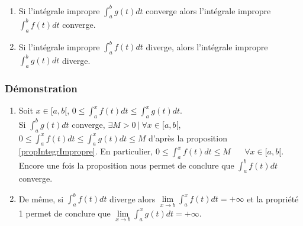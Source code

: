 \documentclass[a4paper,10pt]{book} %
\newcommand{\tq}{~|~}
\newcommand{\displayAmath}{\displaystyle}
\begin{document}
\begin{enumerate}
\item Si l'intégrale impropre $\displayAmath \int_a^bg(t)dt$ converge alors l'intégrale impropre $\displayAmath \int_a^bf(t)dt$ converge.

\item Si l'intégrale impropre $\displayAmath \int_a^bf(t)dt$ diverge, alors l'intégrale impropre $\displayAmath \int_a^bg(t)dt$ diverge.

\end{enumerate}

\subsubsection{Démonstration}
\begin{enumerate}
\item Soit $x\in [a,b[$, $\displayAmath 0\leq \int_a^xf(t)dt\leq \int_a^xg(t)dt$.\\
Si $\displayAmath \int_a^bg(t)dt$ converge, $\exists M>0\tq\forall x\in [a,b[$, $\displayAmath 0\leq \int_a^xf(t)dt\leq \int_a^xg(t)dt\leq M$ d'après la proposition \ref{propIntegrImpropre}. En particulier, $\displayAmath 0\leq \int_a^xf(t)dt\leq M$ ~~ $\forall x\in [a,b[$.\\
Encore une fois la proposition nous permet de conclure que $\displayAmath \int_a^bf(t)dt$ converge.

\item De même, si $\displayAmath \int_a^b f(t)dt$ diverge alors $\displayAmath \lim\limits_{x\rightarrow b}\int_a^xf(t)dt=+\infty$ et la propriété 1 permet de conclure que $\displayAmath\lim\limits_{x\rightarrow b}\int_a^xg(t)dt=+\infty$.
\end{enumerate}
\end{document}

